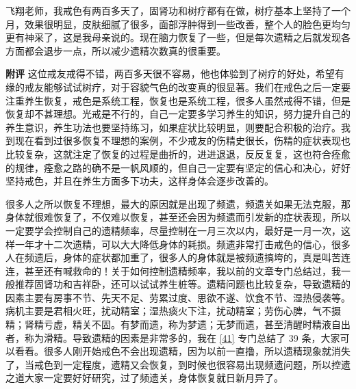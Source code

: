 \begin{case}
    飞翔老师，我戒色有两百多天了，固肾功和树疗都有在做，树疗基本上坚持了一个月，效果很明显，皮肤细腻了很多，面部浮肿得到一些改善，整个人的脸色更均匀更有神采了，这是我母亲说的。现在脑力恢复了一些，但是每次遗精之后就发现各方面都会退步一点，所以减少遗精次数真的很重要。

    \textbf{附评} 这位戒友戒得不错，两百多天很不容易，他也体验到了树疗的好处，希望有缘的戒友能够试试树疗，对于容貌气色的改变真的很显著。我们在戒色之后一定要注重养生恢复，戒色是系统工程，恢复也是系统工程，很多人虽然戒得不错，但是恢复却不甚理想。光戒是不行的，自己一定要多学习养生的知识，努力提升自己的养生意识，养生功法也要坚持练习，如果症状比较明显，则要配合积极的治疗。我到现在看到过很多恢复不理想的案例，不少戒友的伤精史很长，伤精的症状表现也比较复杂，这就注定了恢复的过程是曲折的，进进退退，反反复复，这也符合痊愈的规律，痊愈之路的确不是一帆风顺的，但自己一定要有坚定的信心和决心，好好坚持戒色，并且在养生方面多下功夫，这样身体会逐步改善的。

    很多人之所以恢复不理想，最大的原因就是出现了频遗，频遗关如果无法克服，那身体就很难恢复了，不仅难以恢复，甚至还会因为频遗而引发新的症状表现，所以一定要学会控制自己的遗精频率，尽量控制在一月三次以内，最好是一月一次，这样一年才十二次遗精，可以大大降低身体的耗损。频遗非常打击戒色的信心，很多人在频遗后，身体的症状都加重了，很多人的身体就是被频遗搞垮的，真是叫苦连连，甚至还有喊救命的！关于如何控制遗精频率，我以前的文章专门总结过，我一般推荐固肾功和吉祥卧，还可以试试养生桩等。遗精问题也比较复杂，导致遗精的因素主要有房事不节、先天不足、劳累过度、思欲不遂、饮食不节、湿热侵袭等。病机主要是君相火旺，扰动精室；湿热痰火下注，扰动精室；劳伤心脾，气不摄精；肾精亏虚，精关不固。有梦而遗，称为梦遗；无梦而遗，甚至清醒时精液自出者，称为滑精。导致遗精的因素是非常多的，我在 \ref{41} 专门总结了 39 条，大家可以看看。很多人刚开始戒色不会出现遗精，因为以前一直撸，所以遗精现象就消失了，当戒色到一定程度，遗精又会恢复，到时候也很容易出现频遗问题，所以控遗之道大家一定要好好研究，过了频遗关，身体恢复就日新月异了。
\end{case}

